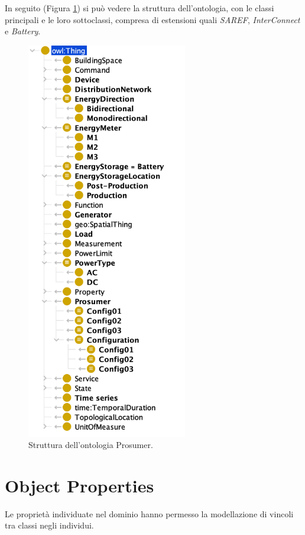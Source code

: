 In seguito (Figura \ref*{fig:classi_prosumer}) si può vedere la struttura dell'ontologia, con le classi principali e le loro sottoclassi, compresa di estensioni quali \textit{SAREF}, \textit{InterConnect} e \textit{Battery}.

\begin{figure}[!ht]
    \centering
    \includegraphics[width=7cm]{images/classi_prosumer.png}
    \caption{Struttura dell'ontologia Prosumer.}
    \label{fig:classi_prosumer}
\end{figure}


\section{Object Properties}
Le proprietà individuate nel dominio hanno permesso la modellazione di vincoli tra classi negli individui.

